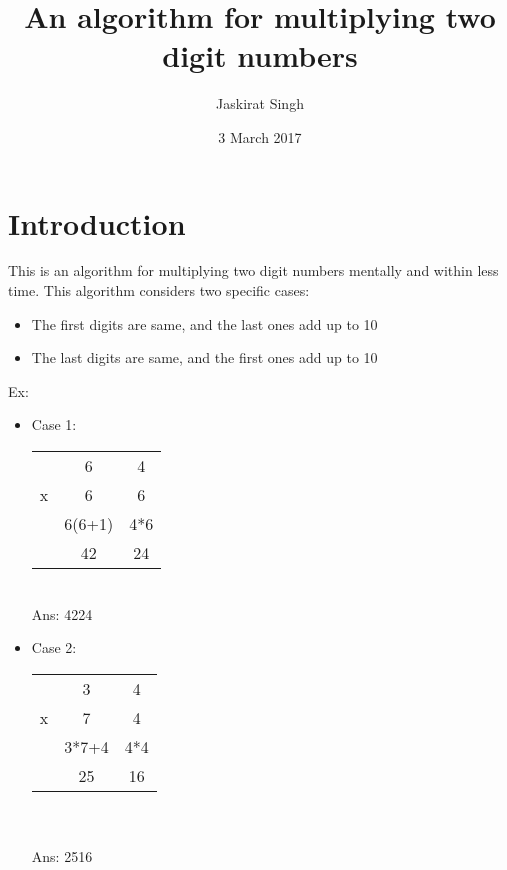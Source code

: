 \documentclass{article}
\title{An algorithm for multiplying two digit numbers}
\author{Jaskirat Singh }
\date{3 March 2017}
\begin{document}
\maketitle

\section{Introduction}
    This is an algorithm for multiplying two digit numbers mentally and within less time.
    This algorithm considers two specific cases: 
    \begin{itemize}
        \item The first digits are same, and the last ones add up to 10
        \item The last digits are same, and the first ones add up to 10
    \end{itemize}
    Ex: %
    \begin{itemize}
        \item Case 1:
            \begin{tabular}{c c c}
                &6 &4\\
                x &6 &6 \\
                \hline
                & 6(6+1) & 4*6 \\
                & 42     & 24  \\
            \end{tabular}
            \\ Ans: 4224
        
        \item Case 2:
            \begin{tabular}{c c c}
                &3 &4\\
                x &7 &4 \\
                \hline
                & 3*7+4 & 4*4 \\
                & 25     & 16  \\
            \end{tabular}
            \\
            \\
             Ans: 2516            
    \end{itemize}
\end{document}
